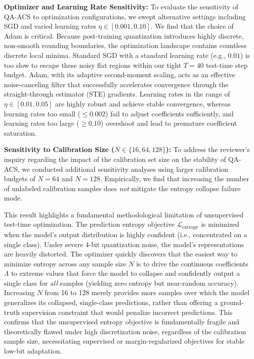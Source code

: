 \documentclass{article}
\theoremstyle{plain}
\theoremstyle{definition}
\theoremstyle{remark}
\begin{document}
\textbf{Optimizer and Learning Rate Sensitivity:} To evaluate the sensitivity of QA-ACS to optimization configurations, we swept alternative settings including SGD and varied learning rates $\eta \in [0.001, 0.10]$. We find that the choice of Adam is critical. Because post-training quantization introduces highly discrete, non-smooth rounding boundaries, the optimization landscape contains countless discrete local minima. Standard SGD with a standard learning rate (e.g., $0.01$) is too slow to escape these noisy flat regions within our tight $T=40$ test-time step budget. Adam, with its adaptive second-moment scaling, acts as an effective noise-canceling filter that successfully accelerates convergence through the straight-through estimator (STE) gradients. Learning rates in the range of $\eta \in [0.01, 0.05]$ are highly robust and achieve stable convergence, whereas learning rates too small ($\le 0.002$) fail to adjust coefficients sufficiently, and learning rates too large ($\ge 0.10$) overshoot and lead to premature coefficient saturation.

\textbf{Sensitivity to Calibration Size ($N \in \{16, 64, 128\}$):} To address the reviewer's inquiry regarding the impact of the calibration set size on the stability of QA-ACS, we conducted additional sensitivity analyses using larger calibration budgets of $N=64$ and $N=128$. Empirically, we find that increasing the number of unlabeled calibration samples does \emph{not} mitigate the entropy collapse failure mode. 

This result highlights a fundamental methodological limitation of unsupervised test-time optimization. The prediction entropy objective $\mathcal{L}_{\text{entropy}}$ is minimized when the model's output distribution is highly confident (i.e., concentrated on a single class). Under severe 4-bit quantization noise, the model's representations are heavily distorted. The optimizer quickly discovers that the easiest way to minimize entropy across any sample size $N$ is to drive the continuous coefficients $\Lambda$ to extreme values that force the model to collapse and confidently output a single class for \emph{all} samples (yielding zero entropy but near-random accuracy). Increasing $N$ from 16 to 128 merely provides more samples over which the model generalizes its collapsed, single-class predictions, rather than offering a ground-truth supervision constraint that would penalize incorrect predictions. This confirms that the unsupervised entropy objective is fundamentally fragile and theoretically flawed under high discretization noise, regardless of the calibration sample size, necessitating supervised or margin-regularized objectives for stable low-bit adaptation.
\end{document}
